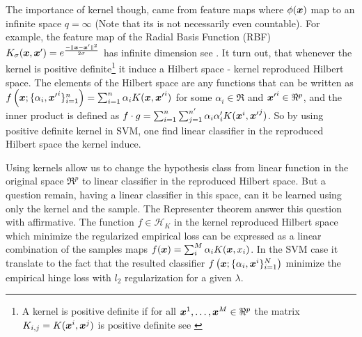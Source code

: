 {The importance of kernel though, came from feature maps where $\phi(\boldsymbol{x})$ map to an infinite space $q=\infty$ (Note that its is not necessarily even countable).
For example, the feature map of the Radial Basis Function (RBF) $K_{\sigma}(\boldsymbol{x},\boldsymbol{x}') = e^{\frac{-\|\boldsymbol{x}-\boldsymbol{x}'\|^2}{2\sigma}}$  has infinite dimension see \cite{shashuaNotes}.
It turn out, that whenever the kernel is positive definite\footnote{A kernel is positive definite if for all $\boldsymbol{x}^1, \ldots, \boldsymbol{x}^M \in \Re^p$ the matrix $K_{i,j} = K(\boldsymbol{x}^i,\boldsymbol{x}^j)$ is positive definite see \cite{hofmann2008kernel}} it induce a Hilbert space - kernel reproduced Hilbert space.
The elements of the Hilbert space are any functions that can be written as $f\left(\boldsymbol{x};\{\alpha_i,{\boldsymbol{x}'}^i\}_{i=1}^n\right) = \sum_{i=1}^n \alpha_i K(\boldsymbol{x},{\boldsymbol{x}'}^i)$ for some $\alpha_i \in \Re$ and ${\boldsymbol{x}'}^i \in \Re^p$, and the inner product is defined as $f \cdot g = \sum_{i=1}^n\sum_{j=1}^{n'} \alpha_i\alpha_i' K(\boldsymbol{x}^i,{\boldsymbol{x}'}^j)$.
So by using positive definite kernel in SVM, one find linear classifier in the reproduced Hilbert space the kernel induce.

Using kernels allow us to change the hypothesis class from linear function in the original space $\Re^p$ to linear classifier in the reproduced Hilbert space.
But a question remain, having a linear classifier in this space, can it be learned using only the kernel and the sample.
The Representer theorem\cite{scholkopf2002learning} answer this question with affirmative.
The function $f \in \mathcal{H}_K$ in the kernel reproduced Hilbert space which minimize the regularized empirical loss can be expressed as a linear combination  of the samples maps $f(\boldsymbol{x}) = \sum_i^M \alpha_i K(\boldsymbol{x},x_i)$.
In the SVM case it translate to the fact that the resulted classifier $f\left(\boldsymbol{x};\{\alpha_i, \boldsymbol{x}^i\}_{i=1}^N\right)$ minimize the empirical hinge loss with $l_2$ regularization for a given $\lambda$.
}

